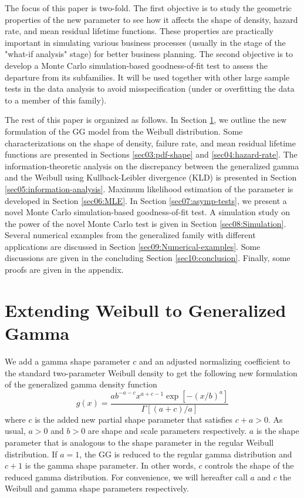 \documentclass{ps}
\theoremstyle{plain}%
\theoremstyle{definition}
\theoremstyle{remark}
\begin{document}
The focus of this paper is two-fold. The first objective is to study the geometric properties of the new parameter to see how it affects the shape of density, hazard rate, and mean residual lifetime functions. These properties are practically important in simulating various business processes (usually in the stage of the "what-if analysis" stage) for better business planning. The second objective is to develop a Monte Carlo simulation-based goodness-of-fit test to assess the departure from its subfamilies. It will be used together with other large sample tests in the data analysis to avoid misspecification (under or overfitting the data to a member of this family).


The rest of this paper is organized as follows. In Section \ref{sec02: model-formulation}, we outline the new formulation of the GG model from the Weibull distribution.  Some characterizations on the shape of density, failure rate, and mean residual lifetime functions are presented in Sections \ref{sec03:pdf-shape} and \ref{sec04:hazard-rate}. The information-theoretic analysis on the discrepancy between the generalized gamma and the Weibull using Kullback-Leibler divergence (KLD) is presented in Section \ref{sec05:information-analysis}. Maximum likelihood estimation of the parameter is developed in Section \ref{sec06:MLE}. In Section \ref{sec07:asymp-tests}, we present a novel Monte Carlo simulation-based goodness-of-fit test. A simulation study on the power of the novel Monte Carlo test is given in Section \ref{sec08:Simulation}. Several numerical examples from the generalized family with different applications are discussed in Section \ref{sec09:Numerical-examples}.  Some discussions are given in the concluding Section \ref{sec10:conclusion}. Finally, some proofs are given in the appendix. 




\section{Extending Weibull to Generalized Gamma } \label{sec02: model-formulation}

We add a gamma shape parameter $c$ and an adjusted normalizing coefficient to the standard two-parameter Weibull density to get the following new formulation of the generalized gamma density function
\begin{equation}\label{new-GG-pdf}
	g(x)=\frac{ab^{-a-c}x^{a+c-1}\exp[-(x/b)^a]}{\Gamma[(a+c)/a]}
\end{equation}
\noindent where $c$ is the added new partial shape parameter that satisfies $c+a > 0$. As usual, $a > 0$ and $b > 0$ are shape and scale parameters respectively. $a$ is the shape parameter that is analogous to the shape parameter in the regular Weibull distribution. If $a = 1$, the GG is reduced to the regular gamma distribution and $c+1$ is the gamma shape parameter. In other words, $c$ controls the shape of the reduced gamma distribution. For convenience, we will hereafter call $a$ and $c$ the Weibull and gamma shape parameters respectively.
\end{document}
